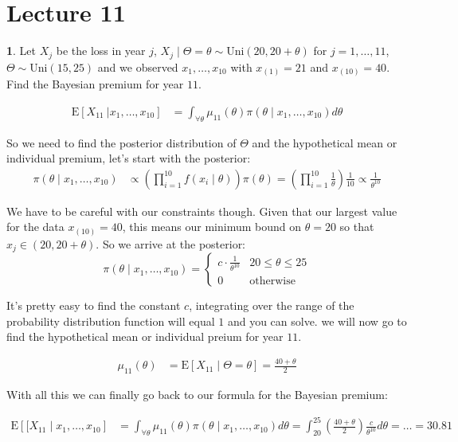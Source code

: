 \documentclass[english,12pt]{article}
\theoremstyle{plain}
\theoremstyle{definition}
\newtheorem*{example}{\protect\examplename}
\theoremstyle{definition} %
\providecommand{\examplename}{Example}
\newcommand{\ex}[1]{\mbox{E} \left[ #1 \right]}
\newcommand{\condex}[2]{\mbox{E} \left[ \left. #1 \ \right\vert \left. #2 \right. \right]}
\begin{document}
\section*{Lecture 11}
\begin{example}
Let $X_j$ be the loss in year $j$, $X_j\mid\Theta=\theta\sim \text{Uni}(20,20+\theta)$ for $j=1,\ldots,11$, $\Theta\sim \text{Uni}(15,25)$ and we observed $x_1,\ldots,x_{10}$ with $x_{(1)}=21$ and $x_{(10)}=40$.  Find the Bayesian premium for year $11$.

\begin{align*}
\condex{X_{11}}{x_1,\ldots,x_{10}}
&=\int_{\forall\theta}\mu_{11}(\theta)\pi(\theta\mid x_1,\ldots,x_{10})d\theta
\end{align*}

So we need to find the posterior distribution of $\Theta$ and the hypothetical mean or individual premium, let's start with the posterior:
\begin{align*}
\pi(\theta\mid x_1,\ldots,x_{10})&\propto\left(\prod_{i=1}^{10}f(x_i\mid\theta)\right)\pi(\theta)
=\left(\prod_{i=1}^{10}\frac{1}{\theta}\right)\frac{1}{10}
\propto \frac{1}{\theta^{10}}
\end{align*}

We have to be careful with our constraints though.  Given that our largest value for the data $x_{(10)}=40$, this means our minimum bound on $\theta=20$ so that $x_j\in(20,20+\theta)$.  So we arrive at the posterior:
\[\pi(\theta\mid x_1,\ldots, x_{10})=\begin{cases}
c\cdot\frac{1}{\theta^{10}} & 20\le\theta\le 25\\
0 & \text{otherwise}
\end{cases}\]

It's pretty easy to find the constant $c$, integrating over the range of the probability distribution function will equal $1$ and you can solve.  we will now go to find the hypothetical mean or individual preium for year $11$.

\begin{align*}
\mu_{11}(\theta)
&=\ex{X_{11}\mid\Theta=\theta}
=\frac{40+\theta}{2}
\end{align*}

With all this we can finally go back to our formula for the Bayesian premium:

\begin{align*}
\ex{[X_{11}\mid x_1,\ldots,x_{10}}
&=\int_{\forall\theta}\mu_{11}(\theta)\pi(\theta\mid x_1,\ldots,x_{10})d\theta
=\int_{20}^{25}\left(\frac{40+\theta}{2}\right)\frac{c}{\theta^{10}}d\theta
=\ldots
=30.81
\end{align*}
\end{example}
\end{document}
